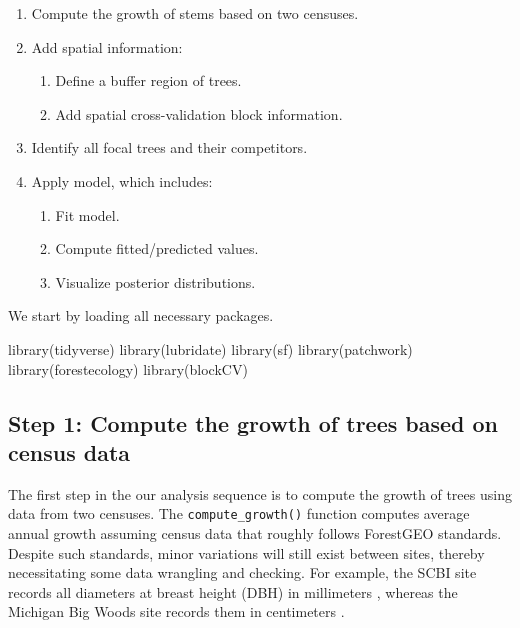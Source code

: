 \documentclass[12pt]{article}
\providecommand{\tightlist}{%
  \setlength{\itemsep}{0pt}\setlength{\parskip}{0pt}}
\newenvironment{Shaded}{\begin{snugshade}}{\end{snugshade}}
\newcommand{\FunctionTok}[1]{\textcolor[rgb]{0.00,0.00,0.00}{#1}}
\newcommand{\NormalTok}[1]{#1}
\begin{document}
\begin{enumerate}
\def\labelenumi{\arabic{enumi}.}
\tightlist
\item
  Compute the growth of stems based on two censuses.
\item
  Add spatial information:

  \begin{enumerate}
  \def\labelenumii{\arabic{enumii}.}
  \tightlist
  \item
    Define a buffer region of trees.
  \item
    Add spatial cross-validation block information.
  \end{enumerate}
\item
  Identify all focal trees and their competitors.
\item
  Apply model, which includes:

  \begin{enumerate}
  \def\labelenumii{\arabic{enumii}.}
  \tightlist
  \item
    Fit model.
  \item
    Compute fitted/predicted values.
  \item
    Visualize posterior distributions.
  \end{enumerate}
\end{enumerate}

We start by loading all necessary packages.

\begin{Shaded}
\begin{Highlighting}[]
\FunctionTok{library}\NormalTok{(tidyverse)}
\FunctionTok{library}\NormalTok{(lubridate)}
\FunctionTok{library}\NormalTok{(sf)}
\FunctionTok{library}\NormalTok{(patchwork)}
\FunctionTok{library}\NormalTok{(forestecology)}
\FunctionTok{library}\NormalTok{(blockCV)}
\end{Highlighting}
\end{Shaded}

\hypertarget{step-1-compute-the-growth-of-trees-based-on-census-data}{%
\subsection{Step 1: Compute the growth of trees based on census
data}\label{step-1-compute-the-growth-of-trees-based-on-census-data}}

The first step in the our analysis sequence is to compute the growth of
trees using data from two censuses. The \texttt{compute\_growth()}
function computes average annual growth assuming census data that
roughly follows ForestGEO standards. Despite such standards, minor
variations will still exist between sites, thereby necessitating some
data wrangling and checking. For example, the SCBI site records all
diameters at breast height (DBH) in millimeters
\citet{bourg_initial_2013}, whereas the Michigan Big Woods site records
them in centimeters \citet{allen_michigan_2020}.
\end{document}
